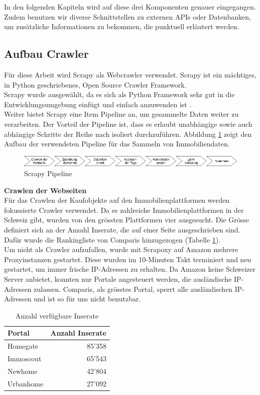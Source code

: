 In den folgenden Kapiteln wird auf diese drei Komponenten genauer eingegangen.
Zudem benutzen wir diverse Schnittstellen zu externen APIs oder Datenbanken, um zusätzliche Informationen zu bekommen, die punktuell erläutert werden.

\subsection{Aufbau Crawler}
Für diese Arbeit wird Scrapy als Webcrawler verwendet. Scrapy ist ein mächtiges, in Python geschriebenes, Open Source Crawler Framework.\\
Scrapy wurde ausgewählt, da es sich als Python Framework sehr gut in die Entwicklungsumgebung einfügt und einfach anzuwenden ist \cite{scrapy}.\\
Weiter bietet Scrapy eine Item Pipeline an, um gesammelte Daten weiter zu verarbeiten. Der Vorteil der Pipeline ist, dass es erlaubt unabhängige sowie auch abhängige Schritte der Reihe nach isoliert durchzuführen. Abbildung \ref{fig:scrapy} zeigt den Aufbau der verwendeten Pipeline für das Sammeln von Immobiliendaten.

\begin{figure}[h]
\centering
\includegraphics[width=\textwidth]{images/scrapy.png}
\caption[Scrapy Pipeline]{Scrapy Pipeline}%
\label{fig:scrapy}
\end{figure}

\textbf{Crawlen der Webseiten}\\
Für das Crawlen der Kaufobjekte auf den Immobilienplattformen werden fokussierte Crawler verwendet. Da es zahlreiche Immobilienplattformen in der Schweiz gibt, wurden von den grössten Plattformen vier ausgesucht. Die Grösse definiert sich an der Anzahl Inserate, die auf einer Seite ausgeschrieben sind. Dafür wurde die Rankingliste von Comparis hinzugezogen (Tabelle \ref{tab:portals}).\\
Um nicht als Crawler aufzufallen, wurde mit Scrapoxy auf Amazon mehrere Proxyinstanzen gestartet. Diese wurden im 10-Minuten Takt terminiert und neu gestartet, um immer frische IP-Adressen zu erhalten. Da Amazon keine Schweizer Server anbietet, konnten nur Portale angesteuert werden, die ausländische IP-Adressen zulassen. Comparis, als grösstes Portal, sperrt alle ausländischen IP-Adressen und ist so für uns nicht benutzbar.

\begin{table}[ht]
\centering
{}
\begin{tabular}{@{}lr@{}}
\toprule
Portal & Anzahl Inserate \\
\midrule
Homegate & 85'358\\
Immoscout & 65'543\\
Newhome & 42'804\\
Urbanhome & 27'092\\
\bottomrule
\end{tabular}
\caption{Anzahl verfügbare Inserate}
\label{tab:portals}
\end{table}

